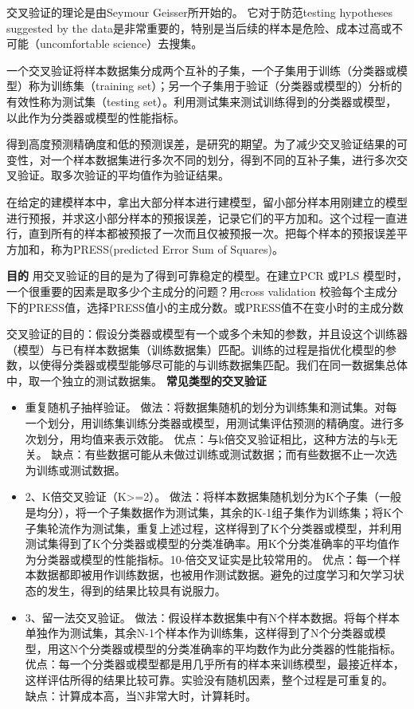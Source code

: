 \documentclass[10pt,a4paper]{ctexbook}
\begin{document}
交叉验证的理论是由Seymour Geisser所开始的。 它对于防范testing hypotheses suggested by the data是非常重要的，特别是当后续的样本是危险、成本过高或不可能（uncomfortable science）去搜集。

一个交叉验证将样本数据集分成两个互补的子集，一个子集用于训练（分类器或模型）称为训练集（training set）；另一个子集用于验证（分类器或模型的）分析的有效性称为测试集（testing set）。利用测试集来测试训练得到的分类器或模型，以此作为分类器或模型的性能指标。

得到高度预测精确度和低的预测误差，是研究的期望。为了减少交叉验证结果的可变性，对一个样本数据集进行多次不同的划分，得到不同的互补子集，进行多次交叉验证。取多次验证的平均值作为验证结果。

在给定的建模样本中，拿出大部分样本进行建模型，留小部分样本用刚建立的模型进行预报，并求这小部分样本的预报误差，记录它们的平方加和。这个过程一直进行，直到所有的样本都被预报了一次而且仅被预报一次。把每个样本的预报误差平方加和，称为PRESS(predicted Error Sum of Squares)。

\textbf{目的}
用交叉验证的目的是为了得到可靠稳定的模型。在建立PCR 或PLS 模型时，一个很重要的因素是取多少个主成分的问题？用cross validation 校验每个主成分下的PRESS值，选择PRESS值小的主成分数。或PRESS值不在变小时的主成分数

交叉验证的目的：假设分类器或模型有一个或多个未知的参数，并且设这个训练器（模型）与已有样本数据集（训练数据集）匹配。训练的过程是指优化模型的参数，以使得分类器或模型能够尽可能的与训练数据集匹配。我们在同一数据集总体中，取一个独立的测试数据集。
\textbf{常见类型的交叉验证}
\begin{itemize}
\item 重复随机子抽样验证。
    \subitem 做法：将数据集随机的划分为训练集和测试集。对每一个划分，用训练集训练分类器或模型，用测试集评估预测的精确度。进行多次划分，用均值来表示效能。
    \subitem 优点：与k倍交叉验证相比，这种方法的与k无关。
    \subitem 缺点：有些数据可能从未做过训练或测试数据；而有些数据不止一次选为训练或测试数据。
\item 2、K倍交叉验证（K>=2）。
    \subitem 做法：将样本数据集随机划分为K个子集（一般是均分），将一个子集数据作为测试集，其余的K-1组子集作为训练集；将K个子集轮流作为测试集，重复上述过程，这样得到了K个分类器或模型，并利用测试集得到了K个分类器或模型的分类准确率。用K个分类准确率的平均值作为分类器或模型的性能指标。10-倍交叉证实是比较常用的。
    \subitem 优点：每一个样本数据都即被用作训练数据，也被用作测试数据。避免的过度学习和欠学习状态的发生，得到的结果比较具有说服力。
\item 3、留一法交叉验证。
    \subitem 做法：假设样本数据集中有N个样本数据。将每个样本单独作为测试集，其余N-1个样本作为训练集，这样得到了N个分类器或模型，用这N个分类器或模型的分类准确率的平均数作为此分类器的性能指标。
    \subitem 优点：每一个分类器或模型都是用几乎所有的样本来训练模型，最接近样本，这样评估所得的结果比较可靠。实验没有随机因素，整个过程是可重复的。
    \subitem 缺点：计算成本高，当N非常大时，计算耗时。
\end{itemize}
\end{document}
